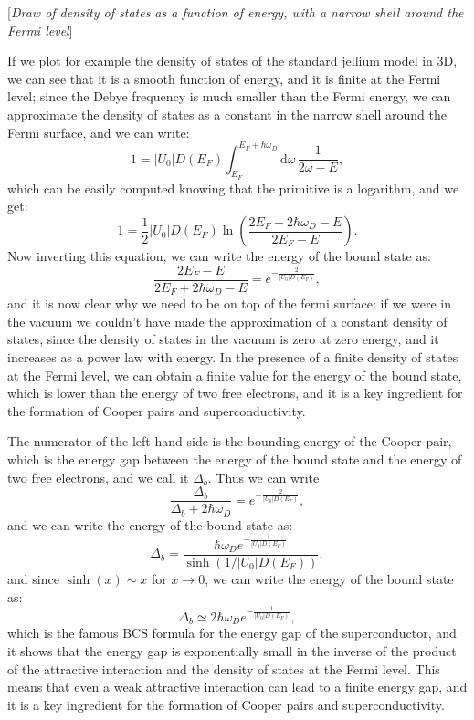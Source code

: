     [\textit{Draw of density of states as a function of energy, with a narrow shell around the Fermi level}]

If we plot for example the density of states of the standard jellium model in 3D, we can see that it is a smooth function of energy, and it is finite at the Fermi level; since the Debye frequency is much smaller than the Fermi energy, we can approximate the density of states as a constant in the narrow shell around the Fermi surface, and we can write:
\[
    1 = \vert U_0 \vert D(E_F) \int_{E_F}^{E_F + \hbar \omega_D} \mathrm{d}\omega \, \frac{1}{2\omega - E},
\]
which can be easily computed knowing that the primitive is a logarithm, and we get:
\[
    1 = \frac{1}{2} \vert U_0 \vert D(E_F) \ln \left( \frac{2E_F + 2\hbar \omega_D - E}{2E_F - E} \right).
\]
Now inverting this equation, we can write the energy of the bound state as:
\[
    \frac{2 E_F - E}{2E_F + 2\hbar \omega_D - E} = e^{-\frac{2}{\vert U_0 \vert D(E_F)}},
\]
and it is now clear why we need to be on top of the fermi surface: if we were in the vacuum we couldn't have made the approximation of a constant density of states, since the density of states in the vacuum is zero at zero energy, and it increases as a power law with energy. In the presence of a finite density of states at the Fermi level, we can obtain a finite value for the energy of the bound state, which is lower than the energy of two free electrons, and it is a key ingredient for the formation of Cooper pairs and superconductivity.

The numerator of the left hand side is the bounding energy of the Cooper pair, which is the energy gap between the energy of the bound state and the energy of two free electrons, and we call it \(\Delta_b\). Thus we can write
\[
    \frac{\Delta_b}{\Delta_b + 2 \hbar \omega_D} = e^{-\frac{2}{\vert U_0 \vert D(E_F)}},
\]
and we can write the energy of the bound state as:
\[
    \Delta_b = \frac{\hbar \omega_D e^{-\frac{1}{\vert U_0 \vert D(E_F)}}}{\sinh(1 / \vert U_0 \vert D(E_F))},
\]
and since \(\sinh(x) \sim x\) for \(x \to 0\), we can write the energy of the bound state as:
\[
    \Delta_b \simeq 2 \hbar \omega_D e^{-\frac{1}{\vert U_0 \vert D(E_F)}},
\]
which is the famous BCS formula for the energy gap of the superconductor, and it shows that the energy gap is exponentially small in the inverse of the product of the attractive interaction and the density of states at the Fermi level. This means that even a weak attractive interaction can lead to a finite energy gap, and it is a key ingredient for the formation of Cooper pairs and superconductivity.

